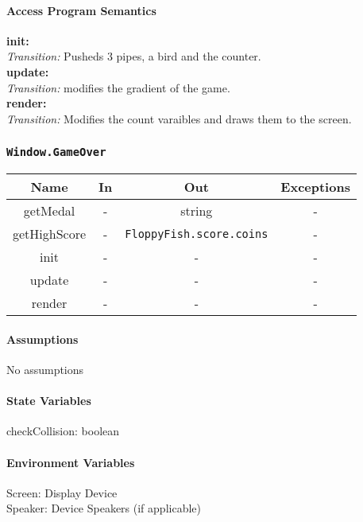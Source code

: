 \documentclass[11pt, oneside]{article}   	%
\begin{document}
\paragraph{Access Program Semantics} 
 \textbf{init:}  \\
 \textit{Transition:} Pusheds 3 pipes, a bird and the counter.\\
 \textbf{update:}  \\
 \textit{Transition:} modifies the gradient of the game.\\
 \textbf{render:}  \\
 \textit{Transition:} Modifies the count varaibles and draws them to the screen.\\


\subsubsection{\texttt{Window.GameOver}}



\begin{center}
\begin{tabular}{ |c|c|c|c| } 
 \hline
 Name & In & Out & Exceptions \\ 
 \hline \hline
 getMedal & - & string & - \\ 
 getHighScore & - & \texttt{FloppyFish.score.coins} & - \\ 
 init & - & - & - \\ 
 update & - & - & - \\ 
 render & - & - & - \\ 

 \hline
\end{tabular}
\end{center}

\paragraph{Assumptions}
No assumptions

\paragraph{State Variables}
checkCollision: boolean\\



\paragraph{Environment Variables}
Screen: Display Device\\
Speaker: Device Speakers (if applicable)\\
\end{document}
